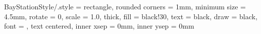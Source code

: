 \tikzset
{
    BayStationStyle/.style =
    {
        rectangle,                                  %
        rounded corners = 1mm,                  %
        minimum size    = 4.5mm,                %
        rotate          = 0,                    %
        scale           = 1.0,                  %
        thick,                                  %
        fill            = black!30,             %
        text            = black,                %
        draw            = black,                %
        font            = \scriptsize,              %
        text centered,                          %
        inner xsep      = 0mm,                  %
        inner ysep      = 0mm                   %
    }
}




